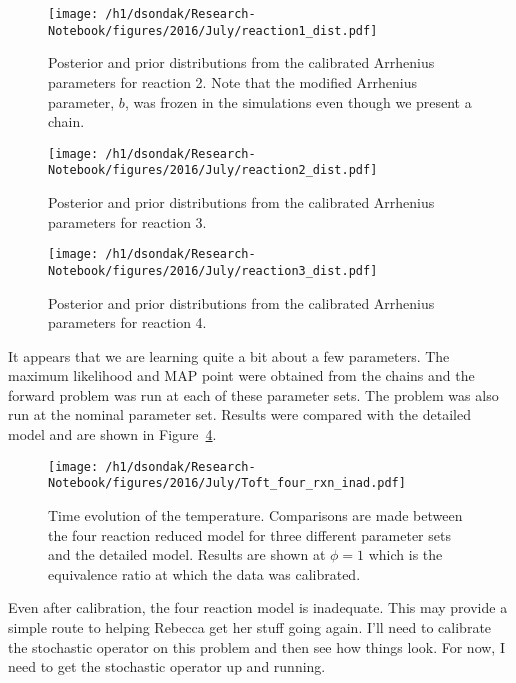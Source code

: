 \begin{figure}[h!]
  \centering
  \texttt{[image: /h1/dsondak/Research-Notebook/figures/2016/July/reaction1\_dist.pdf]}
  \caption{Posterior and prior distributions from the calibrated Arrhenius parameters for reaction 2.  Note that the modified Arrhenius
           parameter, $b$, was frozen in the simulations even though we present a chain.}
  \label{fig:dist_2}
\end{figure}
\begin{figure}[h!]
  \centering
  \texttt{[image: /h1/dsondak/Research-Notebook/figures/2016/July/reaction2\_dist.pdf]}
  \caption{Posterior and prior distributions from the calibrated Arrhenius parameters for reaction 3.}
  \label{fig:dist_3}
\end{figure}
\begin{figure}[h!]
  \centering
  \texttt{[image: /h1/dsondak/Research-Notebook/figures/2016/July/reaction3\_dist.pdf]}
  \caption{Posterior and prior distributions from the calibrated Arrhenius parameters for reaction 4.}
  \label{fig:dist_4}
\end{figure}
It appears that we are learning quite a bit about a few parameters.  The maximum likelihood and MAP point
were obtained from the chains and the forward problem was run at each of these parameter sets.  The 
problem was also run at the nominal parameter set.  Results were compared with the detailed model and are
shown in Figure~\ref{fig:four_rxn_inad}.
\begin{figure}[h!]
  \centering
  \texttt{[image: /h1/dsondak/Research-Notebook/figures/2016/July/Toft\_four\_rxn\_inad.pdf]}
  \caption{Time evolution of the temperature.  Comparisons are made between the four reaction reduced model
           for three different parameter sets and the detailed model.  Results are shown at $\phi=1$ which
           is the equivalence ratio at which the data was calibrated.}
  \label{fig:four_rxn_inad}
\end{figure}
Even after calibration, the four reaction model is inadequate.  This may provide a simple route to helping
Rebecca get her stuff going again.  I'll need to calibrate the stochastic operator on this problem and then
see how things look.  For now, I need to get the stochastic operator up and running.

